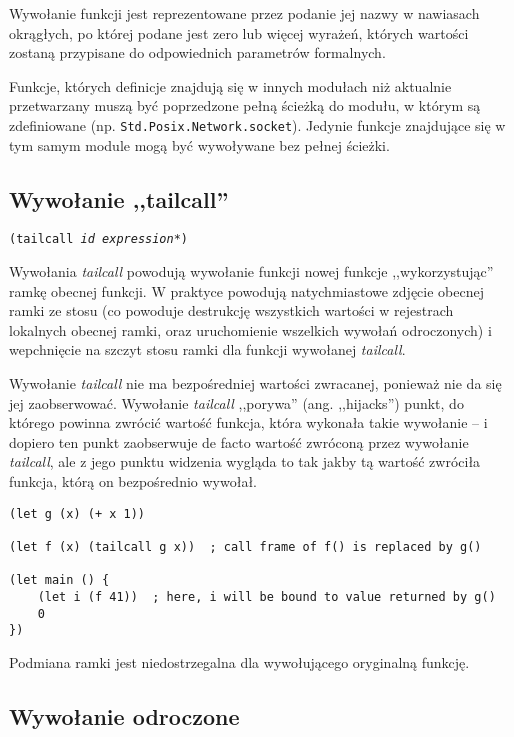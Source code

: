 Wywołanie funkcji jest reprezentowane przez podanie jej nazwy w nawiasach okrągłych, po której podane jest
zero lub więcej wyrażeń, których wartości zostaną przypisane do odpowiednich parametrów formalnych.

Funkcje, których definicje znajdują się w innych modułach niż aktualnie przetwarzany muszą być poprzedzone
pełną ścieżką do modułu, w którym są zdefiniowane (np. \texttt{Std.Posix.Network.socket}). Jedynie funkcje
znajdujące się w tym samym module mogą być wywoływane bez pełnej ścieżki.

\subsection{Wywołanie ,,tailcall''}
\label{viuact_spec_tail_call}

\texttt{(tailcall \emph{id} \emph{expression}*)}
\newline

Wywołania \emph{tailcall} powodują wywołanie funkcji nowej funkcje ,,wykorzystując'' ramkę obecnej funkcji.
W praktyce powodują natychmiastowe zdjęcie obecnej ramki ze stosu (co powoduje destrukcję wszystkich wartości
w rejestrach lokalnych obecnej ramki, oraz uruchomienie wszelkich wywołań odroczonych) i wepchnięcie na szczyt
stosu ramki dla funkcji wywołanej \emph{tailcall}.

Wywołanie \emph{tailcall} nie ma bezpośredniej wartości zwracanej, ponieważ nie da się jej zaobserwować.
Wywołanie \emph{tailcall} ,,porywa'' (ang. ,,hijacks'') punkt, do którego powinna zwrócić wartość funkcja,
która wykonała takie wywołanie -- i dopiero ten punkt zaobserwuje de facto wartość zwróconą przez wywołanie
\emph{tailcall}, ale z jego punktu widzenia wygląda to tak jakby tą wartość zwróciła funkcja, którą on
bezpośrednio wywołał.

\begin{lstlisting}
(let g (x) (+ x 1))

(let f (x) (tailcall g x))  ; call frame of f() is replaced by g()

(let main () {
    (let i (f 41))  ; here, i will be bound to value returned by g()
    0
})
\end{lstlisting}

Podmiana ramki jest niedostrzegalna dla wywołującego oryginalną funkcję.

\subsection{Wywołanie odroczone}
\label{viuact_spec_deferred_call}

